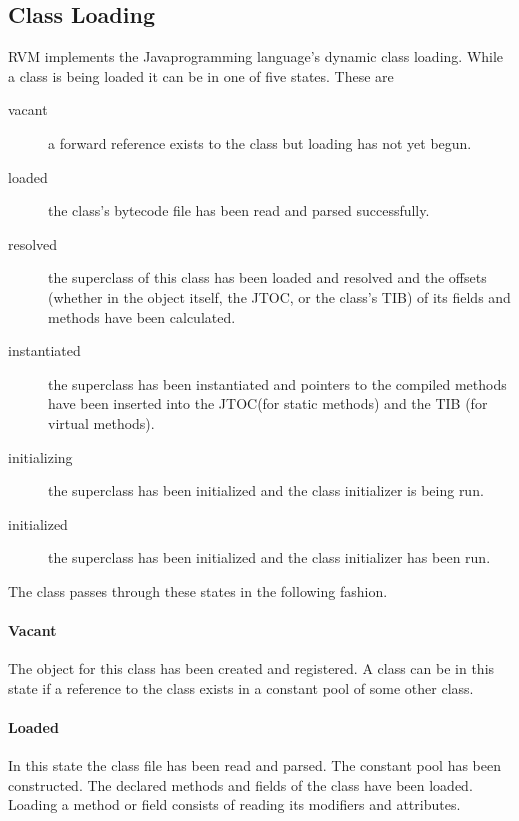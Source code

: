 \JavaTMFooter

\AIXTMFooter

\PowerPCTMFooter

\subsection{Class Loading} \label{sssec:classLoading}

RVM implements the Java\trademark programming language's dynamic class
loading. While a class is being loaded it 
can be in one of five states. These are
\begin{description}
\item[vacant] a forward reference exists to the class but loading has not yet 
begun.
\item[loaded] the class's bytecode file has been read and parsed successfully.
\item[resolved] the superclass of this class has been loaded and resolved and
the offsets (whether in the object itself, the JTOC, or the class's TIB) of its 
fields and methods have been calculated.
\item[instantiated] the superclass has been instantiated and pointers to the
compiled methods have been inserted into the JTOC(for static methods) and the
TIB (for virtual methods).
\item[initializing] the superclass has been initialized and the class
initializer is being run.
\item[initialized] the superclass has been initialized and the class
initializer has been run.
\end{description}

The class passes through these states in the following fashion.

\paragraph{Vacant}
The 
object for this class has been created and registered. 
A class can be in this state if a reference to the class exists in a constant
pool of some other class.

\paragraph{Loaded} 
In this state the class file has been read and parsed.  The constant pool has 
been constructed. The declared methods and fields of the class have been loaded.
Loading a method or field consists of reading its modifiers and attributes.

